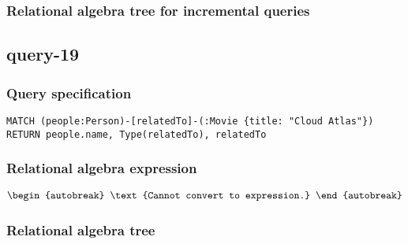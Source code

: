 \subsubsection*{Relational algebra tree for incremental queries}

\subsection{query-19}

\subsubsection*{Query specification}

\begin{lstlisting}
MATCH (people:Person)-[relatedTo]-(:Movie {title: "Cloud Atlas"})
RETURN people.name, Type(relatedTo), relatedTo
\end{lstlisting}

\subsubsection*{Relational algebra expression}

\begin{align*}
\begin{autobreak}
\text{Cannot convert to expression.}
\end{autobreak}
\end{align*}

\subsubsection*{Relational algebra tree}

